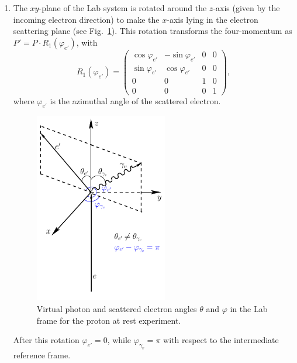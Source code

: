 \begin{enumerate}
\item The $xy$-plane of the Lab system is rotated around the $z$-axis (given by the incoming electron direction) to make the $x$-axis lying in the electron scattering plane (see Fig.~\ref{fig:cr_sec_el_angles}). This rotation transforms the four-momentum as $P' = P \cdot R_1(\varphi_{e'})$, with 
\begin{equation}
R_{1}(\varphi_{e'}) = \begin{pmatrix}
 \cos\varphi_{e'}& -\sin\varphi_{e'} & 0 &0 \\ 
 \sin\varphi_{e'}& \cos\varphi_{e'} &  0& 0\\ 
0 & 0 & 1 &0 \\ 
 0&  0&  0&1 
\end{pmatrix},
\end{equation}
where $\varphi_{e'}$ is the azimuthal angle of the scattered electron.
\begin{figure}[htp]
\begin{center}
\includegraphics[width=5.8cm]{pictures/appendix/electron_angles.pdf}
\caption{\small Virtual photon and scattered electron angles $\theta$ and $\varphi$ in the Lab frame for the proton at rest experiment.} \label{fig:cr_sec_el_angles}
\end{center}
\end{figure}

After this rotation $\varphi_{e'} = 0$, while $\varphi_{\gamma_v} = \pi$ with respect to the intermediate reference frame.


\end{enumerate}
